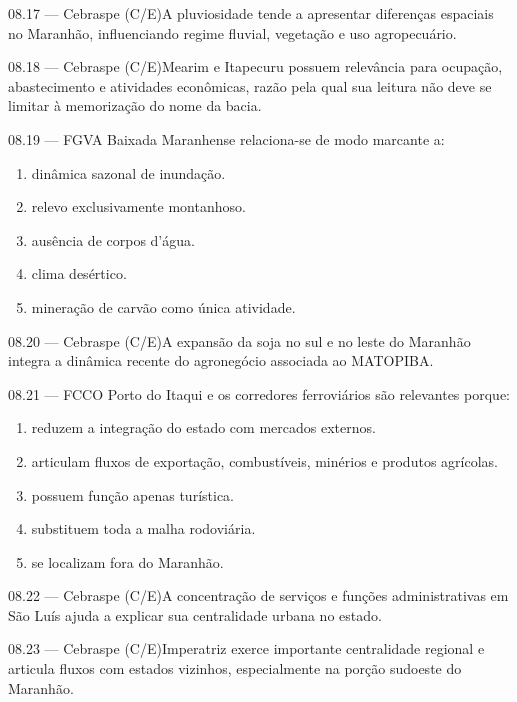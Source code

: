 \begin{questao}{ 08.17 — Cebraspe (C/E)}A pluviosidade tende a apresentar diferenças espaciais no Maranhão, influenciando regime fluvial, vegetação e uso agropecuário.\end{questao}
\begin{questao}{ 08.18 — Cebraspe (C/E)}Mearim e Itapecuru possuem relevância para ocupação, abastecimento e atividades econômicas, razão pela qual sua leitura não deve se limitar à memorização do nome da bacia.\end{questao}
\begin{questao}{ 08.19 — FGV}A Baixada Maranhense relaciona-se de modo marcante a:\begin{enumerate}[label=\Alph*)]\item dinâmica sazonal de inundação.\item relevo exclusivamente montanhoso.\item ausência de corpos d'água.\item clima desértico.\item mineração de carvão como única atividade.\end{enumerate}\end{questao}
\begin{questao}{ 08.20 — Cebraspe (C/E)}A expansão da soja no sul e no leste do Maranhão integra a dinâmica recente do agronegócio associada ao MATOPIBA.\end{questao}
\begin{questao}{ 08.21 — FCC}O Porto do Itaqui e os corredores ferroviários são relevantes porque:\begin{enumerate}[label=\Alph*)]\item reduzem a integração do estado com mercados externos.\item articulam fluxos de exportação, combustíveis, minérios e produtos agrícolas.\item possuem função apenas turística.\item substituem toda a malha rodoviária.\item se localizam fora do Maranhão.\end{enumerate}\end{questao}
\begin{questao}{ 08.22 — Cebraspe (C/E)}A concentração de serviços e funções administrativas em São Luís ajuda a explicar sua centralidade urbana no estado.\end{questao}
\begin{questao}{ 08.23 — Cebraspe (C/E)}Imperatriz exerce importante centralidade regional e articula fluxos com estados vizinhos, especialmente na porção sudoeste do Maranhão.\end{questao}
